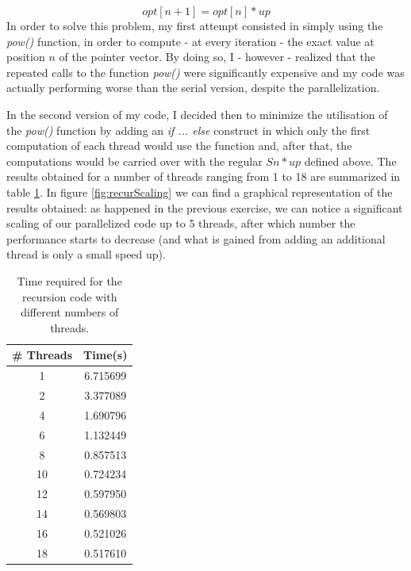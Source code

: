 \documentclass[unicode,11pt,a4paper,oneside,numbers=endperiod,openany]{scrartcl}
\begin{document}
\begin{equation*}
	opt[n+1] = opt[n] * up
\end{equation*}
In order to solve this problem, my first attempt consisted in simply using the \textit{pow()} function, in order to compute - at every iteration -  the exact value at position $n$ of the pointer vector. By doing so, I - however - realized that the repeated calls to the function \textit{pow()} were significantly expensive and my code was actually performing worse than the serial version, despite the parallelization.

In the second version of my code, I decided then to minimize the utilisation of the \textit{pow()} function by adding an \textit{if ... else} construct in which only the first computation of each thread would use the function and, after that, the computations would be carried over with the regular $Sn * up$ defined above. The results obtained for a number of threads ranging from 1 to 18 are summarized in table \ref{tab:recursive}. In figure \ref{fig:recurScaling} we can find a graphical representation of the results obtained: as happened in the previous exercise, we can notice a significant scaling of our parallelized code up to 5 threads, after which number the performance starts to decrease (and what is gained from adding an additional thread is only a small speed up).

\vskip 0.25in


\begin{table}[h]
\begin{center}
	\begin{tabular}{|c|c|}
		\hline
		\textbf{\# Threads} & \textbf{Time(s)}\\
		\hline\hline
		1  & 6.715699  \\
		\hline
		2  & 3.377089  \\
		\hline
		4  & 1.690796  \\
		\hline
		6  & 1.132449  \\
		\hline
		8  & 0.857513  \\
		\hline
		10  & 0.724234  \\
		\hline
		12  & 0.597950  \\
		\hline
		14  & 0.569803  \\
		\hline
		16  & 0.521026  \\
		\hline
		18  & 0.517610  \\
		\hline
	\end{tabular}
\caption{Time required for the recursion code with different numbers of threads.}\label{tab:recursive}
\end{center}
\end{table}
\end{document}
